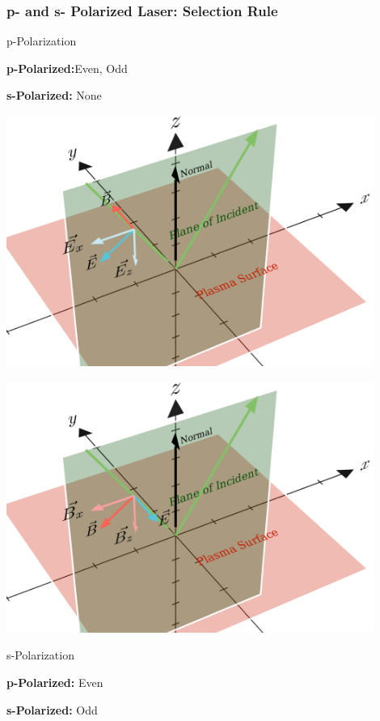 \documentclass{beamer}
\begin{document}
\begin{frame}
    \frametitle{p- and s- Polarized Laser: Selection Rule}
    \begin{minipage}[h]{0.18\linewidth}
        \small{p-Polarization}
        \tiny{
            \textbf{p-Polarized:}Even, Odd

            \textbf{s-Polarized:} None}
    \end{minipage}
    \begin{minipage}[h]{0.8\linewidth}
        \centering
        \includegraphics[width=0.9\textwidth, height=0.42\textheight]{images/p.png}
        \label{fig:p}
    \end{minipage}

    \begin{minipage}[h]{0.8\linewidth}
        \centering
        \includegraphics[width=0.9\textwidth, height=0.42\textheight]{images/s.png}
        \label{fig:s}
    \end{minipage}
    \begin{minipage}[h]{0.18\linewidth}
        \small{s-Polarization}
        \tiny{
            \textbf{p-Polarized:} Even

            \textbf{s-Polarized:} Odd}
    \end{minipage}

\end{frame}
\end{document}
